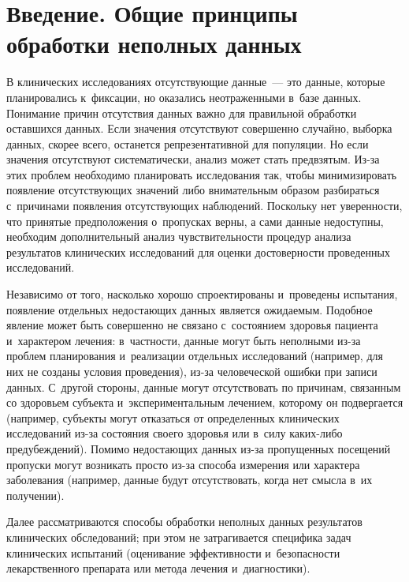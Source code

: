 \begin{multicols}{2}

\label{st\stat}

\section{Введение. Общие принципы обработки неполных 
данных}

     В клинических исследованиях отсутствующие данные~--- это данные, 
которые планировались к~фиксации, но оказались неотраженными в~базе 
данных. Понимание причин отсутствия данных важно для правильной 
обработки оставшихся данных. Если значения отсутствуют совершенно 
случайно, выборка данных, скорее всего, останется репрезентативной для 
популяции. Но если значения отсутствуют систематически, анализ может стать 
предвзятым. Из-за этих проблем необходимо планировать исследования так, 
чтобы минимизировать появление отсутствующих значений либо 
внимательным образом разбираться с~причинами появления отсутствующих 
наблюдений. Поскольку нет уверенности, что принятые предположения 
о~пропусках верны, а сами данные недоступны, необходим дополнительный 
анализ чувствительности процедур анализа результатов клинических 
исследований для оценки достоверности проведенных исследований.
     
     Независимо от того, насколько хорошо спроектированы и~проведены 
испытания, появление отдельных недостающих данных является ожи\-да\-емым. 
Подобное явление может быть совершенно не связано с~состоянием здоровья 
пациента и~характером лечения: в~частности, данные могут быть неполными  
из-за проблем планирования и~реализации отдельных исследований (например, 
для них не созданы условия проведения), из-за человеческой ошибки при 
записи данных. С~другой стороны, данные могут отсутствовать по причинам, 
связан\-ным со здоровьем субъекта и~экспериментальным лечением, которому он 
подвергается (например, субъекты могут отказаться от определенных 
клинических исследований из-за состояния своего здоровья или в~силу  
ка\-ких-ли\-бо предубеждений). Помимо недостающих данных из-за 
пропущенных посещений пропуски могут возникать просто из-за способа 
измерения или характера заболевания (например, данные будут отсутствовать, 
когда нет смысла в~их получении). 
     
     Далее рассматриваются способы обработки неполных данных 
результатов клинических обследований; при этом не затрагивается специфика 
задач клинических испытаний (оценивание эф\-фек\-тив\-ности и~безопасности 
лекарственного препарата или метода лечения и~диагностики). 
     

\end{multicols}
